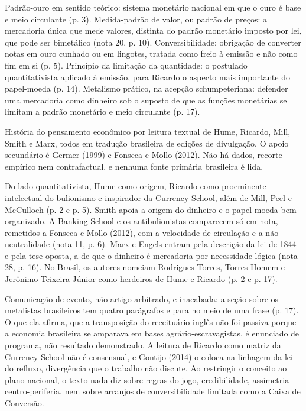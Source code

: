 Padrão-ouro em sentido teórico: sistema monetário nacional em que o ouro é base
e meio circulante (p. 3). Medida-padrão de valor, ou padrão de preços: a
mercadoria única que mede valores, distinta do padrão monetário imposto por
lei, que pode ser bimetálico (nota 20, p. 10). Conversibilidade: obrigação de
converter notas em ouro cunhado ou em lingotes, tratada como freio à emissão e
não como fim em si (p. 5). Princípio da limitação da quantidade: o postulado
quantitativista aplicado à emissão, para Ricardo o aspecto mais importante do
papel-moeda (p. 14). Metalismo prático, na acepção schumpeteriana: defender uma
mercadoria como dinheiro sob o suposto de que as funções monetárias se limitam
a padrão monetário e meio circulante (p. 17).

História do pensamento econômico por leitura textual de Hume, Ricardo, Mill,
Smith e Marx, todos em tradução brasileira de edições de divulgação. O apoio
secundário é Germer (1999) e Fonseca e Mollo (2012). Não há dados, recorte
empírico nem contrafactual, e nenhuma fonte primária brasileira é lida.

Do lado quantitativista, Hume como origem, Ricardo como proeminente intelectual
do bulionismo e inspirador da Currency School, além de Mill, Peel e McCulloch
(p. 2 e p. 5). Smith apoia a origem do dinheiro e o papel-moeda bem organizado.
A Banking School e os antibulionistas comparecem só em nota, remetidos a
Fonseca e Mollo (2012), com a velocidade de circulação e a não neutralidade
(nota 11, p. 6). Marx e Engels entram pela descrição da lei de 1844 e pela tese
oposta, a de que o dinheiro é mercadoria por necessidade lógica (nota 28, p.
16). No Brasil, os autores nomeiam Rodrigues Torres, Torres Homem e Jerônimo
Teixeira Júnior como herdeiros de Hume e Ricardo (p. 2 e p. 17).

Comunicação de evento, não artigo arbitrado, e inacabada: a seção sobre os
metalistas brasileiros tem quatro parágrafos e para no meio de uma frase (p.
17). O que ela afirma, que a transposição do receituário inglês não foi passiva
porque a economia brasileira se amparava em bases agrário-escravagistas, é
enunciado de programa, não resultado demonstrado. A leitura de Ricardo como
matriz da Currency School não é consensual, e Gontijo (2014) o coloca na
linhagem da lei do refluxo, divergência que o trabalho não discute. Ao
restringir o conceito ao plano nacional, o texto nada diz sobre regras do jogo,
credibilidade, assimetria centro-periferia, nem sobre arranjos de
conversibilidade limitada como a Caixa de Conversão.


